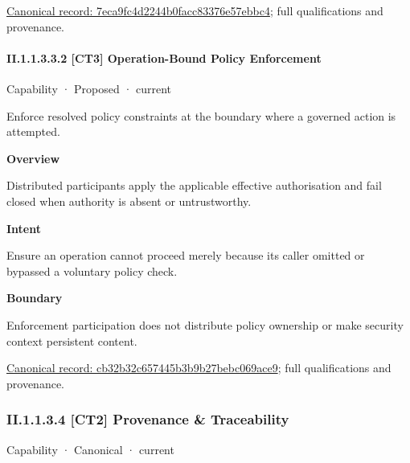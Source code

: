 {\footnotesize \href{../../../../../../../continuum/strategy/capability/7eca9fc4d2244b0facc83376e57ebbc4.md}{Canonical record: 7eca9fc4d2244b0facc83376e57ebbc4}; full qualifications and provenance.}\par
\paragraph*{II.1.1.3.3.2 [CT3] Operation-Bound Policy Enforcement}
\label{navigation:II.1.1.3.3.2}

\label{element:cb32b32c657445b3b9b27bebc069ace9}
{\small Capability · Proposed · current}\par

Enforce resolved policy constraints at the boundary where a governed action is attempted.



\textbf{Overview}



Distributed participants apply the applicable effective authorisation and fail closed when authority is absent or untrustworthy.



\textbf{Intent}



Ensure an operation cannot proceed merely because its caller omitted or bypassed a voluntary policy check.



\textbf{Boundary}



Enforcement participation does not distribute policy ownership or make security context persistent content.


{\footnotesize \href{../../../../../../../continuum/strategy/capability/cb32b32c657445b3b9b27bebc069ace9.md}{Canonical record: cb32b32c657445b3b9b27bebc069ace9}; full qualifications and provenance.}\par
\subsubsection*{II.1.1.3.4 [CT2] Provenance \& Traceability}
\label{navigation:II.1.1.3.4}

\label{element:68a0755aa4e14a509ac5e6c0bbcff3e7}
{\small Capability · Canonical · current}\par

